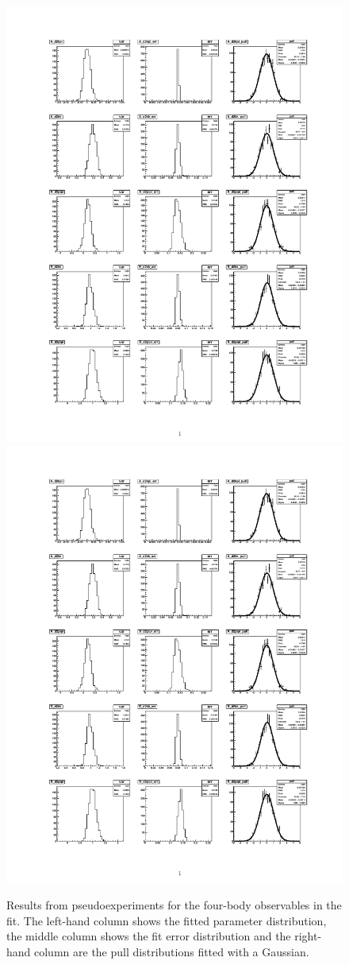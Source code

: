 \begin{figure}[!h]
\centering
\includegraphics[page=2,trim = 0mm 24mm 0mm 113mm,clip,width=0.85\linewidth]{figures/results/toys.pdf}
\includegraphics[page=3,trim = 0mm 165mm 0mm 15mm,clip,width=0.85\linewidth]{figures/results/toys.pdf}
\caption{Results from pseudoexperiments for the four-body \CP observables in the fit. The left-hand column shows the fitted parameter distribution, the middle column shows the fit error distribution and the right-hand column are the pull distributions fitted with a Gaussian.}
\label{pulls2}
\end{figure}

